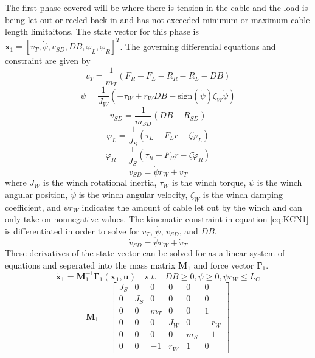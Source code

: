 The first phase covered will be where there is tension in the cable and the load is being let out or reeled back in and has not exceeded minimum or maximum cable length limitaitons. The state vector for this phase is $\mathbf{x}_1 = [v_T, \dot\psi, v_{SD}, DB, \dot\varphi_L, \dot\varphi_R]^T$. The governing differential equations and constraint are given by
\begin{equation}
    v_T = \frac{1}{m_T}(F_R - F_L - R_R - R_L - DB)
\end{equation}
\begin{equation}
    \ddot\psi = \frac{1}{J_W}(- \tau_W + r_WDB - \text{sign}(\dot\psi)\zeta_W\dot\psi)
\end{equation}
\begin{equation}
    \dot v_{SD} = \frac{1}{m_{SD}}(DB - R_{SD})
\end{equation}
\begin{equation}
    \ddot\varphi_L = \frac{1}{J_S}(\tau_L - F_Lr - \zeta\dot\varphi_L)
\end{equation}
\begin{equation}
    \ddot\varphi_R = \frac{1}{J_S}(\tau_R - F_Rr - \zeta\dot\varphi_R)
\end{equation}
\begin{equation}\label{eq:KCN1}
    v_{SD} = \dot{\psi} r_W + v_T
\end{equation}
where $J_W$ is the winch rotational inertia, $\tau_W$ is the winch torque, $\psi$ is the winch angular position, $\dot\psi$ is the winch angular velocity, $\zeta_W$ is the winch damping coefficient, and $\psi r_W$ indicates the amount of cable let out by the winch and can only take on nonnegative values. The kinematic constraint in equation \ref{eq:KCN1} is differentiated in order to solve for $v_T$, $\ddot\psi$, $v_{SD}$, and $DB$.
\begin{equation}
    \dot v_{SD} = \ddot{\psi} r_W + \dot v_T
\end{equation}
These derivatives of the state vector can be solved for as a linear system of equations and seperated into the mass matrix $\mathbf{M}_1$ and force vector $\mathbf{\Gamma}_1$.
\begin{equation}
    \mathbf{\dot x_1} = \mathbf{M}_1^{-1}\mathbf{\Gamma}_1(\mathbf{x_1},\mathbf{u}) \quad s.t. \quad DB\geq0, \psi\geq0, \psi r_W \leq L_C
\end{equation}
\begin{equation}
     \mathbf{M}_1 = \begin{bmatrix} J_S & 0 & 0 & 0 & 0 & 0\\ 0 & J_S & 0 & 0 & 0 & 0 \\ 0 & 0 & m_T & 0 & 0 & 1 \\ 0 & 0 & 0 & J_W & 0 & -r_W \\ 0 & 0 & 0 & 0 & m_S & -1 \\ 0 & 0 & -1 & r_W & 1 & 0 \end{bmatrix}
\end{equation}
